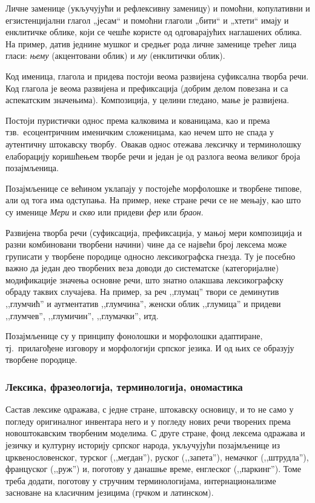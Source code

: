 \begin{multicols}{2}
Личне заменице (укључујући и рефлексивну заменицу) и помоћни, копулативни и егзистенцијални глагол „јесам“ и помоћни глаголи „бити“ и „хтети“ имају и енклитичке облике, који се чешће користе од одговарајућих наглашених облика. На пример, датив једнине мушког и средњег рода личне заменице трећег лица гласи: \textit{њему} (акцентовани облик) и \textit{му} (енклитички облик).

Код именица, глагола и придева постоји веома развијена суфиксална творба речи. Код глагола је веома развијена и префиксација (добрим делом повезана и са аспекатским значењима). Композиција, у целини гледано, мање је развијена. 

Постоји пуристички однос према калковима и кованицама, као и према тзв.~есоцентричним именичким сложеницама, као нечем што не спада у аутентичну  штокавску творбу.~Овакав однос отежава лексичку и терминолошку елаборацију коришћењем творбе речи и један је од разлога веома великог броја позајмљеница.

Позајмљенице се већином уклапају у постојеће морфолошке и творбене типове, али од тога има одступања. На пример, неке стране речи се не мењају, као што су именице \textit{Мери} и \textit{скво} или придеви \textit{фер} или \textit{браон}. 

Развијена творба речи (суфиксација, префиксација, у мањој мери композиција и разни комбиновани творбени начини) чине да се највећи број лексема може груписати у творбене породице односно лексикографска гнезда. Ту је посебно важно да један део творбених веза доводи до систематске (категоријалне) модификације значења основне речи,  што знатно олакшава лексикографску обраду таквих случајева. На пример, за реч ,,глумац'' твори се деминутив ,,глумчић'' и аугментатив ,,глумчина'', женски облик ,,глумица'' и придеви ,,глумчев'', ,,глумичин'', ,,глумачки'', итд. 

Позајмљенице су у принципу фонолошки и морфолошки адаптиране, тј.~прилагођене изговору и морфологији српског језика. И од њих се образују творбене породице.


\subsubsection {Лексика, фразеологија, терминологија, ономастика}
  
Састав лексике одражава, с једне стране,  штокавску основицу, и то не само у погледу оригиналног инвентара него и у погледу нових речи творених према новоштокавским творбеним моделима. С друге стране, фонд лексема одражава и језичку и културну историју српског народа, укључујући позајмљенице из црквенословенског, турског (,,мегдан''), руског (,,запета''), немачког (,,штрудла''), француског (,,руж'') и, поготову у данашње време, енглеског (,,паркинг''). Томе треба додати, поготову у стручним терминологијама, интернационализме засноване на класичним језицима (грчком и латинском).


\end{multicols}
